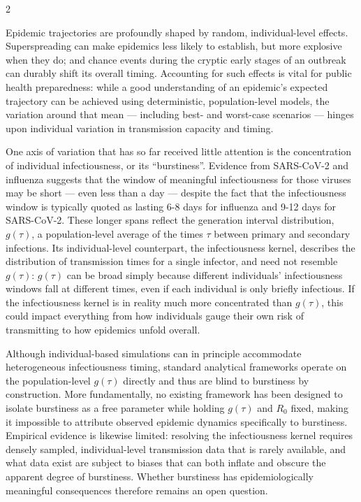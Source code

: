 \documentclass[10pt]{article}
\begin{document}
\begin{multicols}{2}

Epidemic trajectories are profoundly shaped by random, individual-level effects. Superspreading can make epidemics less likely to establish, but more explosive when they do; and chance events during the cryptic early stages of an outbreak can durably shift its overall timing.\citep{lloyd-smith_superspreading_2005, morris_computation_2024} Accounting for such effects is vital for public health preparedness: while a good understanding of an epidemic's expected trajectory can be achieved using deterministic, population-level models, the variation around that mean --- including best- and worst-case scenarios --- hinges upon individual variation in transmission capacity and timing. 

One axis of variation that has so far received little attention is the concentration of individual infectiousness, or its ``burstiness''. Evidence from SARS-CoV-2 and influenza suggests that the window of meaningful infectiousness for those viruses may be short --- even less than a day --- despite the fact that the infectiousness window is typically quoted as lasting 6-8 days for influenza and 9-12 days for SARS-CoV-2.\citep{goyal_viral_2021, centers_for_disease_control_and_prevention_yellow_2025, centers_for_disease_control_and_prevention_about_2026} These longer spans reflect the generation interval distribution, $g(\tau)$, a population-level average of the times $\tau$ between primary and secondary infections. Its individual-level counterpart, the infectiousness kernel\citep{svensson_note_2007, champredon_intrinsic_2015}, describes the distribution of transmission times for a single infector, and need not resemble $g(\tau)$: $g(\tau)$ can be broad simply because different individuals' infectiousness windows fall at different times, even if each individual is only briefly infectious. If the infectiousness kernel is in reality much more concentrated than $g(\tau)$, this could impact everything from how individuals gauge their own risk of transmitting to how epidemics unfold overall. 

Although individual-based simulations can in principle accommodate heterogeneous infectiousness timing, standard analytical frameworks operate on the population-level $g(\tau)$ directly and thus are blind to burstiness by construction. More fundamentally, no existing framework has been designed to isolate burstiness as a free parameter while holding $g(\tau)$ and $R_0$ fixed, making it impossible to attribute observed epidemic dynamics specifically to burstiness. Empirical evidence is likewise limited: resolving the infectiousness kernel requires densely sampled, individual-level transmission data that is rarely available, and what data exist are subject to biases that can both inflate and obscure the apparent degree of burstiness. Whether burstiness has epidemiologically meaningful consequences therefore remains an open question. 


\end{multicols}
\end{document}
